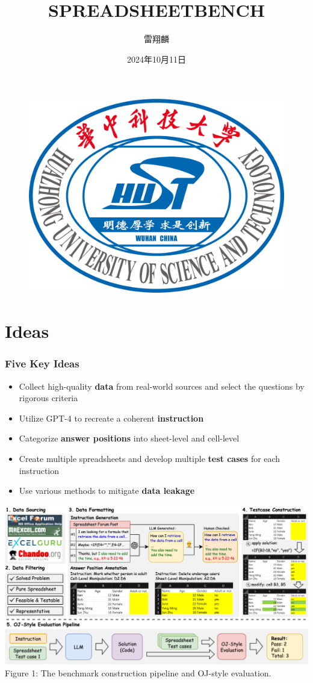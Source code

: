 \documentclass{beamer}
\author{雷翔麟}
\title{SPREADSHEETBENCH}
\institute{华中科技大学计算机科学与技术学院}
\date{2024年10月11日}
\begin{document}
\kaishu
\begin{frame}
    \titlepage
    \begin{figure}[htpb]
        \begin{center}
            \includegraphics[width=0.2\linewidth]{pic/HUST_LOGO.png}
        \end{center}
    \end{figure}
\end{frame}

\begin{frame}
    \tableofcontents[sectionstyle=show,subsectionstyle=show/shaded/hide,subsubsectionstyle=show/shaded/hide]
\end{frame}

\section{Ideas}

\begin{frame}
    \frametitle{Five Key Ideas}
    \begin{itemize}
        \item Collect high-quality \textbf{data} from real-world sources and select the questions by rigorous criteria
        \item Utilize GPT-4 to recreate a coherent \textbf{instruction}
        \item Categorize \textbf{answer positions} into sheet-level and cell-level
        \item Create multiple spreadsheets and develop multiple \textbf{test cases} for each instruction
        \item Use various methods to mitigate \textbf{data leakage}
    \end{itemize}
\end{frame}

\begin{frame}
    \centering
    \includegraphics[width=1\linewidth]{pic/construction pipeline.png}
    \vspace{0.2cm}
    {\footnotesize Figure 1: The benchmark construction pipeline and OJ-style evaluation.}
\end{frame}
\end{document}
